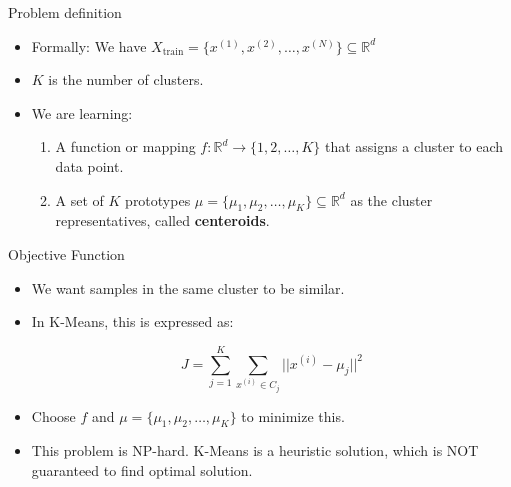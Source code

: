 \documentclass[serif, aspectratio=169]{beamer}
\begin{document}
\begin{frame}{Problem definition}
    \begin{itemize}
        \item Formally: We have $X_{\text{train}} = \{ x^{(1)}, x^{(2)}, \dots, x^{(N)} \} \subseteq \mathbb{R}^d$
        \item $K$ is the number of clusters.
        \item We are learning:
        \begin{enumerate}
            \item A function or mapping $f:\mathbb{R}^d\to \{1,2, \dots , K\}$ that assigns a cluster to each data point.
            \item A set of \( K \) prototypes \(\mu = \{ \mu_1, \mu_2, \dots, \mu_K  \} \subseteq \mathbb{R}^d \) as the cluster representatives, called \textbf{centeroids}.
        \end{enumerate}
       
    \end{itemize}
\end{frame}

\begin{frame}{Objective Function}
\begin{itemize}

    \item We want samples in the same cluster to be similar.
    \item In K-Means, this is expressed as:

    $$
    J = \sum_{j=1}^K \sum_{x^{(i)}\in C_j} || x^{(i)} -  \mu_j ||^2
    $$

\item Choose $f$ and $\mu = \{\mu_1,\mu_2,\dots,\mu_K\}$ to minimize this.
        \item This problem is NP-hard. K-Means is a heuristic solution, which is NOT guaranteed to find optimal solution.
\end{itemize}
\end{frame}
\end{document}
